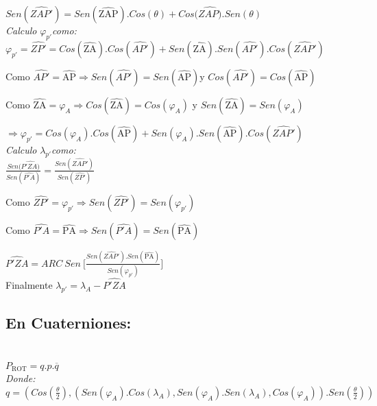 \documentclass[spanish]{article}
\begin{document}
\(Sen(\widehat{ZAP'}) = Sen(\widehat{\text{ZAP}}).Cos(\theta) + Cos(\widehat{ZAP)}.Sen(\theta)\)\\

\emph{Calculo} \(\varphi_{p'}\)\emph{como:}\\

\(\varphi_{p'} = \widehat{ZP'} = Cos(\widehat{\text{ZA}}).Cos(\widehat{AP'}) + Sen(\widehat{\text{ZA}}).Sen(\widehat{AP'}).Cos(\widehat{ZAP'})\)

Como
\(\widehat{AP'} = \widehat{\text{AP}} \Rightarrow Sen(\widehat{AP'}) = Sen(\widehat{\text{AP}})\)y
\(Cos(\widehat{AP'}) = Cos(\widehat{\text{AP}})\)

Como
\(\widehat{\text{ZA}} = \varphi_{A} \Rightarrow Cos(\widehat{\text{ZA}}) = Cos(\varphi_{A})\)
y \(Sen(\widehat{\text{ZA}}) = Sen(\varphi_{A})\)

\(\Rightarrow \varphi_{p'} = Cos(\varphi_{A}).Cos(\widehat{\text{AP}}) + Sen(\varphi_{A}).Sen(\widehat{\text{AP}}).Cos(\widehat{ZAP'})\)\\

\emph{Calculo} \(\lambda_{p'}\)\emph{como:}\\

\(\frac{Sen(\widehat{P'ZA)}}{Sen(\widehat{P'A})} = \frac{Sen(\widehat{ZAP'})}{Sen(\widehat{ZP'})}\)

Como
\(\widehat{ZP'} = \varphi_{p'} \Rightarrow Sen(\widehat{ZP'}) = Sen(\varphi_{p'})\)

Como
\(\widehat{P'A} = \widehat{\text{PA}} \Rightarrow Sen(\widehat{P'A}) = Sen(\widehat{\text{PA}})\)

\(\widehat{P'ZA} = ARC\ Sen\ \lbrack\frac{Sen(\widehat{ZAP'}).Sen(\widehat{\text{PA}})}{Sen(\varphi_{p'})}\rbrack\)\\

Finalmente \(\lambda_{p'} = \lambda_{A} - \widehat{P'ZA}\)\\

\subsection{En Cuaterniones:}\\

\(P_{\text{ROT}} = q.p.\overline{q}\)\\

\emph{Donde:}\\

\(q = (Cos(\frac{\theta}{2}),(Sen(\varphi_{A}).Cos(\lambda_{A}),Sen(\varphi_{A}).Sen(\lambda_{A}),Cos(\varphi_{A})).Sen(\frac{\theta}{2}))\)
\end{document}
